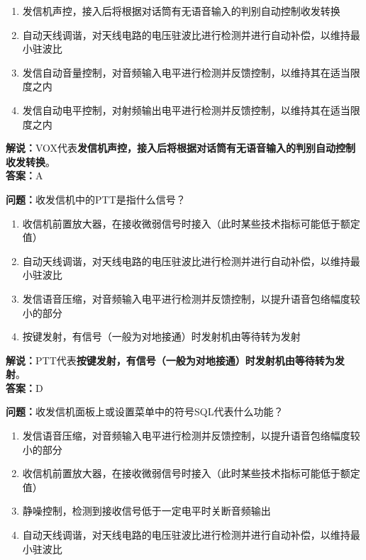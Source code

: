 \documentclass{ctexbook}
\begin{document}
\begin{enumerate}[label=\Alph*), leftmargin=3em]
	\item 发信机声控，接入后将根据对话筒有无语音输入的判别自动控制收发转换
	\item 自动天线调谐，对天线电路的电压驻波比进行检测并进行自动补偿，以维持最小驻波比
	\item 发信自动音量控制，对音频输入电平进行检测并反馈控制，以维持其在适当限度之内
	\item 发信自动电平控制，对射频输出电平进行检测并反馈控制，以维持其在适当限度之内
\end{enumerate}

\noindent\textbf{解说：}VOX代表\textbf{发信机声控，接入后将根据对话筒有无语音输入的判别自动控制收发转换}。\\\noindent\textbf{答案：}A


\bigskip


\noindent\textbf{问题：}收发信机中的PTT是指什么信号？

\begin{enumerate}[label=\Alph*), leftmargin=3em]
	\item 收信机前置放大器，在接收微弱信号时接入（此时某些技术指标可能低于额定值）
	\item 自动天线调谐，对天线电路的电压驻波比进行检测并进行自动补偿，以维持最小驻波比
	\item 发信语音压缩，对音频输入电平进行检测并反馈控制，以提升语音包络幅度较小的部分
	\item 按键发射，有信号（一般为对地接通）时发射机由等待转为发射
\end{enumerate}

\noindent\textbf{解说：}PTT代表\textbf{按键发射，有信号（一般为对地接通）时发射机由等待转为发射}。\\\noindent\textbf{答案：}D


\bigskip


\noindent\textbf{问题：}收发信机面板上或设置菜单中的符号SQL代表什么功能？

\begin{enumerate}[label=\Alph*), leftmargin=3em]
	\item 发信语音压缩，对音频输入电平进行检测并反馈控制，以提升语音包络幅度较小的部分
	\item 收信机前置放大器，在接收微弱信号时接入（此时某些技术指标可能低于额定值）
	\item 静噪控制，检测到接收信号低于一定电平时关断音频输出
	\item 自动天线调谐，对天线电路的电压驻波比进行检测并进行自动补偿，以维持最小驻波比
\end{enumerate}
\end{document}
